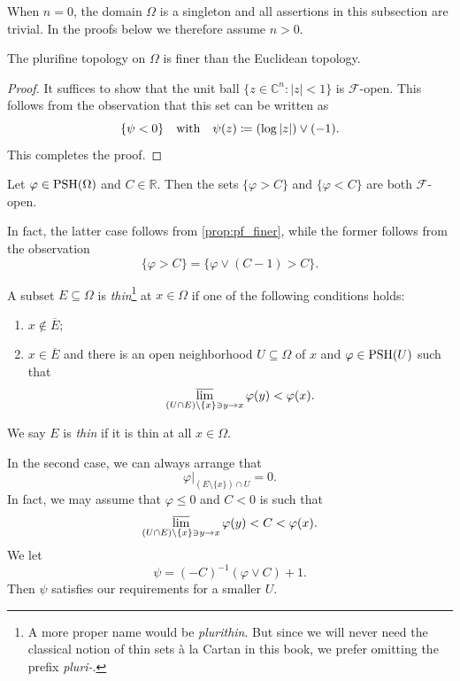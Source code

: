When $n=0$, the domain $\Omega$ is a singleton and all assertions in this subsection are trivial. In the proofs below we therefore assume $n>0$.


\begin{proposition}\label{prop:pf_finer}
  The plurifine topology on $\Omega$ is finer than the Euclidean topology.
\end{proposition}
\begin{proof}
  It suffices to show that the unit ball $\{z\in \mathbb{C}^n:|z|<1\}$ is $\mathcal{F}$-open. This follows from the observation that this set can be written as
  \[
      \{\psi<0\} \quad\textup{with}\quad \psi(z)\coloneqq (\log |z|) \lor (-1).
  \]
  This completes the proof.
\end{proof}

\begin{example}\label{ex:pfopenpsh}
    Let $\varphi\in \mathrm{PSH}(\Omega)$ and $C\in \mathbb{R}$. Then the sets $\{\varphi>C\}$ and $\{\varphi<C\}$ are both $\mathcal{F}$-open.

    In fact, the latter case follows from \cref{prop:pf_finer}, while the former follows from the observation
    \[
    \{\varphi>C\}=\{\varphi\lor (C-1)>C\}.
    \]
\end{example}

\begin{definition}\label{def:pshfunctions:L691}
  A subset $E\subseteq \Omega$ is \emph{thin}\footnote{A more proper name would be \emph{plurithin}. But since we will never need the classical notion of thin sets à la Cartan in this book, we prefer omitting the prefix \emph{pluri-}.} at $x\in \Omega$ if one of the following conditions holds:
  \begin{enumerate}
    \item\label{itm:chapter-pshfunctions:L698:1} $x\not\in \overline{E}$;
    \item\label{itm:chapter-pshfunctions:L698:2} $x\in \overline{E}$ and there is an open neighborhood $U\subseteq \Omega$ of $x$ and $\varphi\in \mathrm{PSH}(U)$ such that
    \[
      \varlimsup_{(U\cap E)\setminus\{x\} \ni y\to x} \varphi(y)<\varphi(x).
    \]
  \end{enumerate}
  We say $E$ is \emph{thin} if it is thin at all $x\in \Omega$.
\end{definition}
\begin{remark}\label{rmk:cstthindef}
    In the second case, we can always arrange that
    \[
    \varphi|_{(E\setminus \{x\})\cap U}=0.
    \]
    In fact, we may assume that $\varphi\leq 0$ and $C<0$ is such that
    \[
    \varlimsup_{(U\cap E)\setminus\{x\} \ni y\to x} \varphi(y)<C<\varphi(x).
    \]
    We let
    \[
        \psi=(-C)^{-1}(\varphi\lor C)+1.
    \]
    Then $\psi$ satisfies our requirements for a smaller $U$.
\end{remark}

